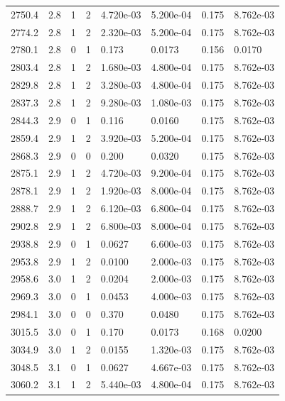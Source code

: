 \documentclass[preview]{standalone}
\begin{document}
{{{{{{\begin{tabular}{L{1.2cm}C{1.2cm} C{0.3cm}C{0.5cm} C{1.4cm}C{1.4cm} C{1.4cm}C{1.4cm}}
  2750.4  &   2.8  & 1     &  2 &  4.720e-03  & 5.200e-04  & 0.175 &  8.762e-03   \\ 
  2774.2  &   2.8  & 1     &  2 &  2.320e-03  & 5.200e-04  & 0.175 &  8.762e-03   \\ 
  2780.1  &   2.8  & 0     &  1 &  0.173  & 0.0173  & 0.156 &  0.0170   \\ 
  2803.4  &   2.8  & 1     &  2 &  1.680e-03  & 4.800e-04  & 0.175 &  8.762e-03   \\ 
  2829.8  &   2.8  & 1     &  2 &  3.280e-03  & 4.800e-04  & 0.175 &  8.762e-03   \\ 
  2837.3  &   2.8  & 1     &  2 &  9.280e-03  & 1.080e-03  & 0.175 &  8.762e-03   \\ 
  2844.3  &   2.9  & 0     &  1 &  0.116  & 0.0160  & 0.175 &  8.762e-03   \\ 
  2859.4  &   2.9  & 1     &  2 &  3.920e-03  & 5.200e-04  & 0.175 &  8.762e-03   \\ 
  2868.3  &   2.9  & 0     &  0 &  0.200  & 0.0320  & 0.175 &  8.762e-03   \\ 
  2875.1  &   2.9  & 1     &  2 &  4.720e-03  & 9.200e-04  & 0.175 &  8.762e-03   \\ 
  2878.1  &   2.9  & 1     &  2 &  1.920e-03  & 8.000e-04  & 0.175 &  8.762e-03   \\ 
  2888.7  &   2.9  & 1     &  2 &  6.120e-03  & 6.800e-04  & 0.175 &  8.762e-03   \\ 
  2902.8  &   2.9  & 1     &  2 &  6.800e-03  & 8.000e-04  & 0.175 &  8.762e-03   \\ 
  2938.8  &   2.9  & 0     &  1 &  0.0627  & 6.600e-03  & 0.175 &  8.762e-03   \\ 
  2953.8  &   2.9  & 1     &  2 &  0.0100  & 2.000e-03  & 0.175 &  8.762e-03   \\ 
  2958.6  &   3.0  & 1     &  2 &  0.0204  & 2.000e-03  & 0.175 &  8.762e-03   \\ 
  2969.3  &   3.0  & 0     &  1 &  0.0453  & 4.000e-03  & 0.175 &  8.762e-03   \\ 
  2984.1  &   3.0  & 0     &  0 &  0.370  & 0.0480  & 0.175 &  8.762e-03   \\ 
  3015.5  &   3.0  & 0     &  1 &  0.170  & 0.0173  & 0.168 &  0.0200   \\ 
  3034.9  &   3.0  & 1     &  2 &  0.0155  & 1.320e-03  & 0.175 &  8.762e-03   \\ 
  3048.5  &   3.1  & 0     &  1 &  0.0627  & 4.667e-03  & 0.175 &  8.762e-03   \\ 
  3060.2  &   3.1  & 1     &  2 &  5.440e-03  & 4.800e-04  & 0.175 &  8.762e-03   \\ 

\end{tabular}}}}}}}
\end{document}
